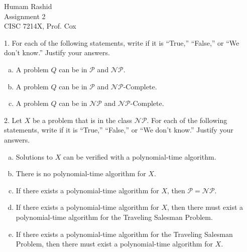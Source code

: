 \documentclass{scrartcl}
\begin{document}
\begin{flushleft}

    Humam Rashid\\
    Assignment 2\\
    CISC 7214X, Prof. Cox\\
    \bigskip

    1. For each of the following statements, write if it is ``True,'' ``False,'' or ``We don't
    know.'' Justify your answers.\\
    \begin{enumerate}[(a)]
        \item A problem $Q$ can be in $\mathcal{P}$ and $\mathcal{NP}$.
        \item A problem $Q$ can be in $\mathcal{P}$ and $\mathcal{NP}$-Complete.
        \item A problem $Q$ can be in $\mathcal{NP}$ and $\mathcal{NP}$-Complete.
    \end{enumerate}
    2. Let $X$ be a problem that is in the class $\mathcal{NP}$. For each of the following
    statements, write if it is ``True,'' ``False,'' or ``We don't know.'' Justify your answers.\\
    \begin{enumerate}[(a)]
        \item Solutions to $X$ can be verified with a polynomial-time algorithm.
        \item There is no polynomial-time algorithm for $X$.
        \item If there exists a polynomial-time algorithm for $X$, then $\mathcal{P} =
            \mathcal{NP}$.
        \item If there exists a polynomial-time algorithm for $X$, then there must exist a
            polynomial-time algorithm for the Traveling Salesman Problem.
        \item If there exists a polynomial-time algorithm for the Traveling Salesman Problem, then
            there must exist a polynomial-time algorithm for $X$.
    \end{enumerate}
    
\end{flushleft}
\end{document}
